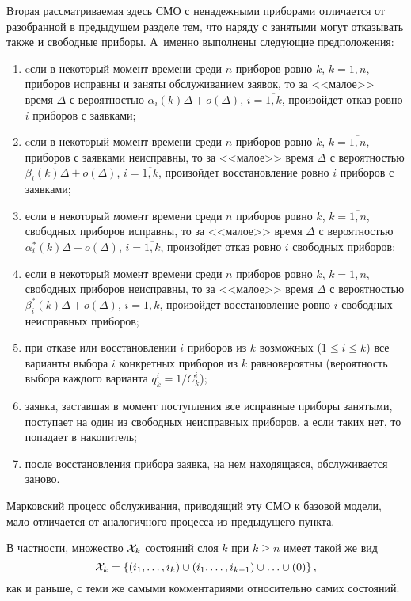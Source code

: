 \begin{multicols}{2}
Вторая рассматриваемая здесь СМО с ненадежными приборами отличается
от разобранной в предыду\-щем разделе тем, что наряду с
занятыми могут отказывать также и свободные приборы.
А~именно выполнены следующие предположения:
\begin{enumerate}[(1)]
\item eсли в некоторый момент времени среди $n$ приборов ровно
$k$, $k=\overline{1,n}$, приборов исправны и заняты обслуживанием
заявок, то за <<малое>> время $\Delta$ с вероятностью
$\alpha_i(k)\Delta+o(\Delta)$, $i=\overline{1,k}$, произойдет отказ
ровно $i$ приборов с заявками;
\item
eсли в некоторый момент времени среди $n$ приборов
ровно $k$, $k=\overline{1,n}$, приборов с заявками неисправны,
то за <<малое>> время $\Delta$ с вероятностью
$\beta_i(k)\Delta+o(\Delta)$, $i=\overline{1,k}$,
произойдет восстановление ровно $i$ приборов с заявками;
\item
если в некоторый момент времени среди $n$ приборов
ровно $k$, $k=\overline{1,n}$, свободных приборов исправны,
то за <<малое>> время $\Delta$ с ве\-ро\-ят\-ностью
$\alpha^*_i(k)\Delta+o(\Delta)$, $i=\overline{1,k}$,
произойдет отказ ровно $i$ свободных приборов;
\item
если в некоторый момент времени среди $n$ приборов
ровно $k$, $k=\overline{1,n}$, свободных приборов неисправны,
то за <<малое>> время $\Delta$ с вероятностью
$\beta^*_i(k)\Delta+o(\Delta)$, $i=\overline{1,k}$,
произойдет восстановление ровно $i$ свободных неисправных приборов;
\item
при отказе или восстановлении $i$ приборов из $k$ возможных ($1\le i\le k$)
все варианты выбора $i$ конкретных приборов из $k$ равновероятны
(вероятность выбора каждого варианта $q^i_k=1/C^i_k$);
\item
заявка, заставшая в момент поступления все исправные приборы
занятыми, поступает на один из свободных неисправных приборов, а
если таких нет, то попадает в накопитель;
\item
после восстановления прибора заявка, на нем находящаяся,
обслуживается заново.
\end{enumerate}

Марковский процесс обслуживания, приводящий эту СМО к базовой
модели, мало отличается от аналогичного процесса из предыдущего
пункта.

В частности, множество ${\cal X}_k$ состояний слоя $k$ при
$k\ge n$ имеет такой же вид
$$
{\cal X}_k
=
\{(i_1,\ldots,i_k)\cup (i_1,\ldots,i_{k-1})\cup\ldots\cup(0)\}\,,
$$
как и раньше, с теми же самыми комментариями относительно самих
состояний.


\end{multicols}
